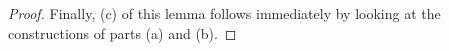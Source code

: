 \documentclass{amsart}
\theoremstyle{plain}
\theoremstyle{definition}
\theoremstyle{remark}
\numberwithin{equation}{section}
\newcommand \halfcan{L}
\begin{document}
\begin{proof}
Finally, (c) of this lemma follows immediately by looking at the constructions of parts (a) and (b).  






%
%
%

\end{proof}
\end{document}
